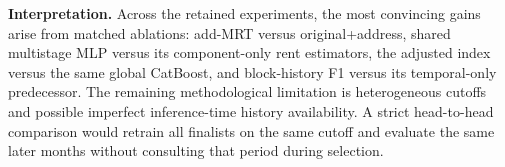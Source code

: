 \documentclass[10pt,a4paper]{article}
\begin{document}
\textbf{Interpretation.} Across the retained experiments, the most convincing gains arise from matched ablations: add-MRT versus original+address, shared multistage MLP versus its component-only rent estimators, the adjusted index versus the same global CatBoost, and block-history F1 versus its temporal-only predecessor. The remaining methodological limitation is heterogeneous cutoffs and possible imperfect inference-time history availability. A strict head-to-head comparison would retrain all finalists on the same cutoff and evaluate the same later months without consulting that period during selection.
\end{document}
